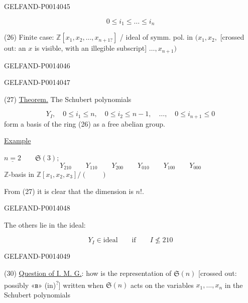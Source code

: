\begin{GelfandAdjacentEvidence}{GELFAND-P001404}{5}

\[
0\le i_1\le\dots\le i_n
\]

(26) Finite case:
\(\mathbb{Z}[x_1,x_2,\dots,x_{n+1?}]\) / ideal of symm. pol. in
\((x_1,x_2,\)
[crossed out: an \(x\) is visible, with an illegible subscript]
\(\dots,x_{n+1})\)

\end{GelfandAdjacentEvidence}
\begin{GelfandAdjacentEvidence}{GELFAND-P001404}{6}



\end{GelfandAdjacentEvidence}
\begin{GelfandAdjacentEvidence}{GELFAND-P001404}{7}


(27) \uline{Theorem.} The Schubert polynomials

\begin{equation*}
Y_I,\quad 0\le i_1\le n,\quad 0\le i_2\le n-1,\quad\dots,\quad
0\le i_{n+1}\le 0 \tag{28}
\end{equation*}
form a basis of the ring (26) as a free abelian group.

\uline{Example}

\(\underline{n=2}\qquad\mathfrak{S}(3);\)
\[
Y_{210}\qquad Y_{110}\qquad Y_{200}\qquad
Y_{010}\qquad Y_{100}\qquad Y_{000}
\]
\(\mathbb{Z}\)-basis in \(\mathbb{Z}[x_1,x_2,x_3]/(\qquad)\)

From (27) it is clear that the dimension is \(n!\).
\end{GelfandAdjacentEvidence}
\begin{GelfandAdjacentEvidence}{GELFAND-P001404}{8}


The others lie in the ideal:

\begin{equation*}
Y_I\in\mathrm{ideal}\qquad\text{if}\qquad I\nleq 210 \tag{29}
\end{equation*}
\end{GelfandAdjacentEvidence}
\begin{GelfandAdjacentEvidence}{GELFAND-P001404}{9}


(30) \uline{Question of I. M. G.}: how is the representation of \(\mathfrak{S}(n)\)
[crossed out: possibly «в» (in)\textsuperscript{?}]
written when \(\mathfrak{S}(n)\) acts on the variables \(x_1,\dots,x_n\) in the Schubert polynomials

\end{GelfandAdjacentEvidence}
